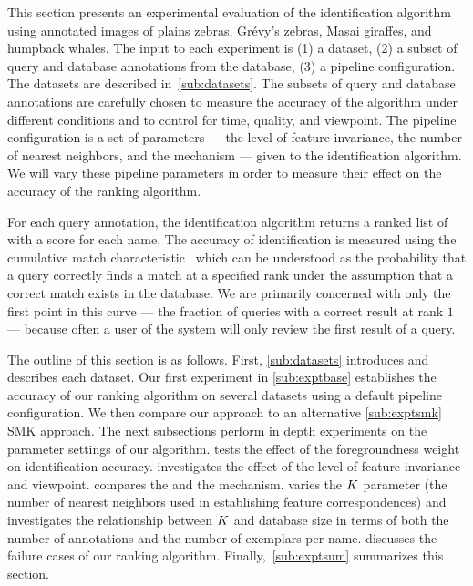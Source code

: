     This section presents an experimental evaluation of the identification algorithm using annotated images of
      plains zebras, Grévy's zebras, Masai giraffes, and humpback whales.
    The input to each experiment is
    (1) a dataset,
    (2) a subset of query and database annotations from the database,
    (3) a pipeline configuration.
    The datasets are described in~\cref{sub:datasets}.
    The subsets of query and database annotations are carefully chosen to measure the accuracy of the algorithm
      under different conditions and to control for time, quality, and viewpoint.
    The pipeline configuration is a set of parameters --- \eg{} the level of feature invariance, the number of
      nearest neighbors, and the \namescoring{} mechanism --- given to the identification algorithm.
    We will vary these pipeline parameters in order to measure their effect on the accuracy of the ranking
      algorithm.

    For each query annotation, the identification algorithm returns a ranked list of \names{} with a score for each
    name. The accuracy of identification is measured using the cumulative match
    characteristic~\cite{decann_relating_2013} which can be understood as the probability that a query correctly
    finds a match at a specified rank under the assumption that a correct match exists in the database. We are
    primarily concerned with only the first point in this curve --- the fraction of queries with a correct result at
    rank $1$ --- because often a user of the system will only review the first result of a query.

    The outline of this section is as follows. First, \cref{sub:datasets} introduces and describes each dataset.
    Our first experiment in \cref{sub:exptbase} establishes the accuracy of our ranking algorithm on several
    datasets using a default pipeline configuration. We then compare our approach to an alternative
    \cref{sub:exptsmk} SMK approach. The next subsections perform in depth experiments on the parameter settings of
    our algorithm.  tests the effect of the foregroundness weight on identification accuracy.
     investigates the effect of the level of feature invariance and viewpoint.
     compares the \csumprefix{} and the \nsumprefix{} \namescoring{} mechanism.
     varies the $K$ parameter (the number of nearest neighbors used in establishing feature
    correspondences) and investigates the relationship between $K$ and database size in terms of both the number
    of annotations and the number of exemplars per name.  discusses the failure cases of our
    ranking algorithm. Finally,~\cref{sub:exptsum} summarizes this section.


